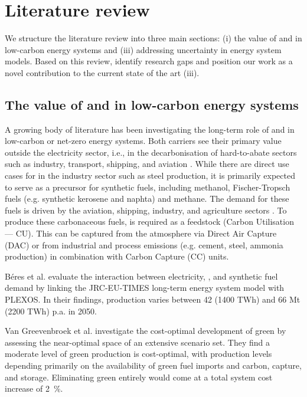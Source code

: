 \documentclass[preprint,12pt,sort&compress]{elsarticle}
\begin{document}
\section{Literature review}
\label{sec:literature_review}
We structure the literature review into three main sections: (i) the value of  and  in low-carbon energy systems and (iii) addressing uncertainty in energy system models. Based on this review, identify research gaps and position our work as a novel contribution to the current state of the art (iii).

\subsection{The value of  and  in low-carbon energy systems} 
A growing body of literature has been investigating the long-term role of  and  in low-carbon or net-zero energy systems. Both carriers see their primary value outside the electricity sector, i.e., in the decarbonisation of hard-to-abate sectors such as industry, transport, shipping, and aviation \cite{reigstadMovingLowcarbonHydrogen2022}. While there are direct use cases for  in the industry sector such as steel production, it is primarily expected to serve as a precursor for synthetic fuels, including methanol, Fischer-Tropsch fuels (e.g. synthetic kerosene and naphta) and methane. The demand for these fuels is driven by the aviation, shipping, industry, and agriculture sectors \cite{neumannPotentialRoleHydrogen2023}. To produce these carbonaceous fuels,  is required as a feedstock (Carbon Utilisation --- CU). This  can be captured from the atmosphere via Direct Air Capture (DAC) or from industrial and process emissions (e.g. cement, steel, ammonia production) in combination with Carbon Capture (CC) units.

Béres et al. \cite{beresWillHydrogenSynthetic2024} evaluate the interaction between electricity, , and synthetic fuel demand by linking the JRC-EU-TIMES long-term energy system model with PLEXOS. In their findings,  production varies between 42 (1400 TWh) and 66 Mt (2200 TWh) p.a. in 2050. 

Van Greevenbroek et al. \cite{greevenbroekLittleLoseCase2024} investigate the cost-optimal development of green  by assessing the near-optimal space of an extensive scenario set. They find a moderate level of green  production is cost-optimal, with production levels depending primarily on the availability of green fuel imports and carbon, capture, and storage. Eliminating green  entirely would come at a total system cost increase of \SI{2}{\percent}. 
\end{document}

